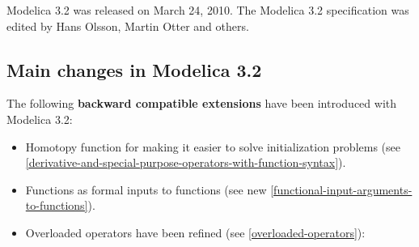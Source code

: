 Modelica 3.2 was released on March 24, 2010. The Modelica 3.2
specification was edited by Hans Olsson, Martin Otter and others.

\subsection{Main changes in Modelica 3.2}

The following \textbf{backward compatible extensions} have been
introduced with Modelica 3.2:

\begin{itemize}
\item
  Homotopy function for making it easier to solve initialization
  problems (see \autoref{derivative-and-special-purpose-operators-with-function-syntax}).
\item
  Functions as formal inputs to functions (see new \autoref{functional-input-arguments-to-functions}).
\item
  Overloaded operators have been refined (see \autoref{overloaded-operators}):


\end{itemize}
